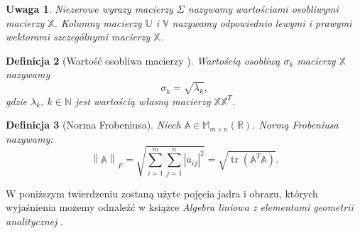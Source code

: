 \documentclass[12pt,a4paper]{report}
\newtheorem{df}{Definicja}[chapter]
\newtheorem{uwaga}[df]{Uwaga}
\newcommand{\setN}{\mathbb{N}}
\newcommand{\norm}[2][]{\left\| {#2} \right\|_{#1}}
\newcommand{\tr}[1]{\operatorname{tr}\left({#1} \right)}
\begin{document}
\begin{uwaga}
Niezerowe wyrazy macierzy $\Sigma$ nazywamy wartościami osobliwymi macierzy $\mathbb{X}$.
Kolumny macierzy $\mathbb{U}$ i $\mathbb{V}$ nazywamy odpowiednio lewymi i prawymi wektorami szczególnymi macierzy $\mathbb{X}$.
\end{uwaga}

\begin{df}[Wartość osobliwa macierzy {\citep{wayls}}]
Wartością osobliwą $\sigma_k$ macierzy $\mathbb{X}$ nazywamy
$$
\sigma_k = \sqrt{\lambda_k},
$$
gdzie $\lambda_k, \: k \in \setN$ jest wartością własną macierzy $\mathbb{X} \mathbb{X}^T$.
\end{df}

\begin{df}[Norma Frobeniusa{\citep{ulafiir}}] %
Niech $\mathbb{A}\in \mathbb{M}_{m\times n}(\mathbb{R})$. Normą Frobeniusa nazywamy:
$$
{\norm{\mathbb{A}}}_F = \sqrt{\sum_{i=1}^m \sum_{j=1}^n |a_{ij}|^2} = \sqrt{\tr{\mathbb{A}^T \mathbb{A}}}.
$$
\end{df}

W poniższym twierdzeniu zostaną użyte pojęcia jadra i obrazu, których wyjaśnienia możemy odnaleźć w książce \textit{Algebra liniowa z elementami geometrii analitycznej} {\citep[Sec 9.1]{alzega}}.
\end{document}
